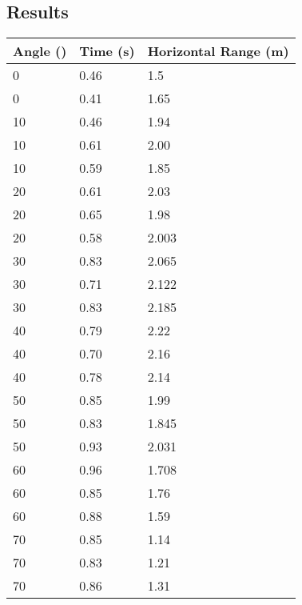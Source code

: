 	\subsection{Results}
		\begin{table}[htbp] \label{5.2 Table of Results}
			\centering
			\begin{tabular}{l|l|l}
				Angle (\textdegree) & Time (s)	& Horizontal Range (m)  \\ \hline
				0 					& 0.46		& 1.5 		\\
				0 					& 0.41		& 1.65		\\ \hline
				10					& 0.46		& 1.94		\\
				10					& 0.61		& 2.00		\\
				10					& 0.59		& 1.85		\\ \hline
				20					& 0.61		& 2.03		\\
				20					& 0.65		& 1.98		\\
				20					& 0.58		& 2.003		\\ \hline
				30					& 0.83		& 2.065		\\
				30					& 0.71		& 2.122		\\
				30					& 0.83		& 2.185		\\ \hline
				40					& 0.79		& 2.22		\\
				40					& 0.70		& 2.16		\\
				40					& 0.78		& 2.14		\\ \hline
				50					& 0.85		& 1.99		\\
				50					& 0.83		& 1.845		\\
				50					& 0.93		& 2.031		\\ \hline
				60					& 0.96		& 1.708		\\
				60					& 0.85		& 1.76		\\
				60					& 0.88		& 1.59		\\ \hline
				70					& 0.85		& 1.14		\\
				70					& 0.83		& 1.21		\\
				70					& 0.86		& 1.31		\\ \bottomrule
			\end{tabular}
		\end{table}

